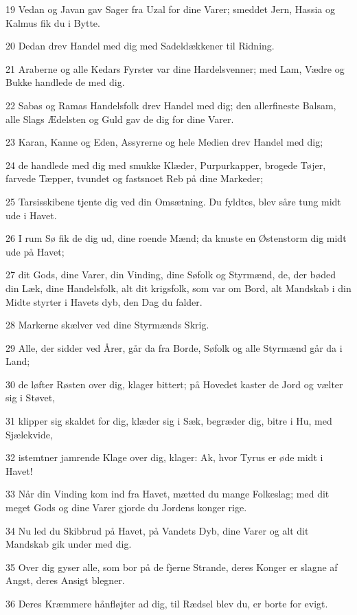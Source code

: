 \par 19 Vedan og Javan gav Sager fra Uzal for dine Varer; smeddet Jern, Hassia og Kalmus fik du i Bytte.
\par 20 Dedan drev Handel med dig med Sadeldækkener til Ridning.
\par 21 Araberne og alle Kedars Fyrster var dine Hardelsvenner; med Lam, Vædre og Bukke handlede de med dig.
\par 22 Sabas og Ramas Handelsfolk drev Handel med dig; den allerfineste Balsam, alle Slags Ædelsten og Guld gav de dig for dine Varer.
\par 23 Karan, Kanne og Eden, Assyrerne og hele Medien drev Handel med dig;
\par 24 de handlede med dig med smukke Klæder, Purpurkapper, brogede Tøjer, farvede Tæpper, tvundet og fastsnoet Reb på dine Markeder;
\par 25 Tarsisskibene tjente dig ved din Omsætning. Du fyldtes, blev såre tung midt ude i Havet.
\par 26 I rum Sø fik de dig ud, dine roende Mænd; da knuste en Østenstorm dig midt ude på Havet;
\par 27 dit Gods, dine Varer, din Vinding, dine Søfolk og Styrmænd, de, der bøded din Læk, dine Handelsfolk, alt dit krigsfolk, som var om Bord, alt Mandskab i din Midte styrter i Havets dyb, den Dag du falder.
\par 28 Markerne skælver ved dine Styrmænds Skrig.
\par 29 Alle, der sidder ved Årer, går da fra Borde, Søfolk og alle Styrmænd går da i Land;
\par 30 de løfter Røsten over dig, klager bittert; på Hovedet kaster de Jord og vælter sig i Støvet,
\par 31 klipper sig skaldet for dig, klæder sig i Sæk, begræder dig, bitre i Hu, med Sjælekvide,
\par 32 istemtner jamrende Klage over dig, klager: Ak, hvor Tyrus er øde midt i Havet!
\par 33 Når din Vinding kom ind fra Havet, mætted du mange Folkeslag; med dit meget Gods og dine Varer gjorde du Jordens konger rige.
\par 34 Nu led du Skibbrud på Havet, på Vandets Dyb, dine Varer og alt dit Mandskab gik under med dig.
\par 35 Over dig gyser alle, som bor på de fjerne Strande, deres Konger er slagne af Angst, deres Ansigt blegner.
\par 36 Deres Kræmmere hånfløjter ad dig, til Rædsel blev du, er borte for evigt.

